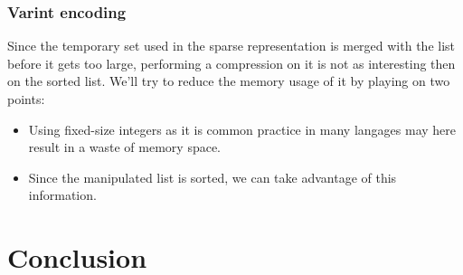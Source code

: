 \documentclass{article}
\begin{document}
\subsubsection{Varint encoding}
Since the temporary set used in the sparse representation is merged
with the list before it gets too large, performing a compression on it
is not as interesting then on the sorted list. We'll try to reduce the
memory usage of it by playing on two points:
\begin{itemize}
\item Using fixed-size integers as it is common practice in many
  langages may here result in a waste of memory space.
\item Since the manipulated list is sorted, we can take advantage of
  this information.
\end{itemize}


\section{Conclusion}
\end{document}

